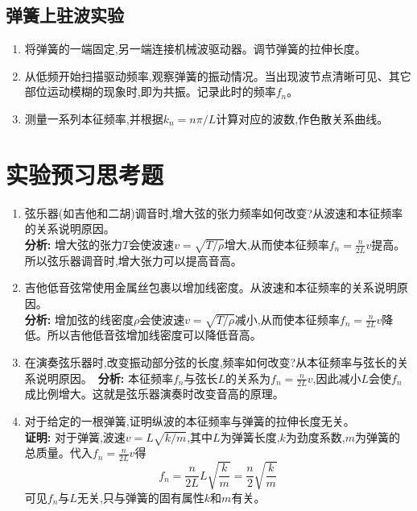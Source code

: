 \documentclass[UTF8]{ctexart}
\begin{document}
\subsection{弹簧上驻波实验}
\begin{enumerate}
\item 将弹簧的一端固定,另一端连接机械波驱动器。调节弹簧的拉伸长度。
\item 从低频开始扫描驱动频率,观察弹簧的振动情况。当出现波节点清晰可见、其它部位运动模糊的现象时,即为共振。记录此时的频率$f_n$。
\item 测量一系列本征频率,并根据$k_n = n\pi/L$计算对应的波数,作色散关系曲线。
\end{enumerate}
\section{实验预习思考题}
\begin{enumerate}
\item 弦乐器(如吉他和二胡)调音时,增大弦的张力频率如何改变?从波速和本征频率的关系说明原因。\
\\ \textbf{分析:} 增大弦的张力$T$会使波速$v=\sqrt{T/\rho}$增大,从而使本征频率$f_n = \frac{n}{2L}v$提高。所以弦乐器调音时,增大张力可以提高音高。
\item 吉他低音弦常使用金属丝包裹以增加线密度。从波速和本征频率的关系说明原因。\
\\ \textbf{分析:} 增加弦的线密度$\rho$会使波速$v=\sqrt{T/\rho}$减小,从而使本征频率$f_n = \frac{n}{2L}v$降低。所以吉他低音弦增加线密度可以降低音高。
\item 在演奏弦乐器时,改变振动部分弦的长度,频率如何改变?从本征频率与弦长的关系说明原因。\
\textbf{分析:} 本征频率$f_n$与弦长$L$的关系为$f_n = \frac{n}{2L}v$,因此减小$L$会使$f_n$成比例增大。这就是弦乐器演奏时改变音高的原理。
\item 对于给定的一根弹簧,证明纵波的本征频率与弹簧的拉伸长度无关。\
\\ \textbf{证明:} 对于弹簧,波速$v=L\sqrt{k/m}$,其中$L$为弹簧长度,$k$为劲度系数,$m$为弹簧的总质量。代入$f_n = \frac{n}{2L}v$得
\begin{equation}
f_n = \frac{n}{2L} L \sqrt{\frac{k}{m}} = \frac{n}{2} \sqrt{\frac{k}{m}}
\end{equation}
可见$f_n$与$L$无关,只与弹簧的固有属性$k$和$m$有关。
\end{enumerate}
\end{document}
